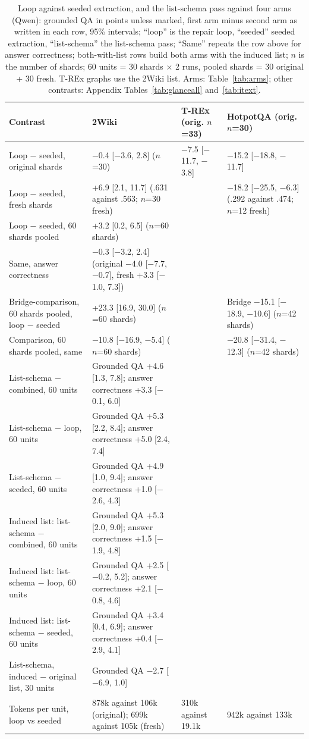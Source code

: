 \begin{table}[t]
\centering
\caption{Loop against seeded extraction, and the list-schema pass against four arms (Qwen): grounded QA in points unless marked, first arm minus second arm as written in each row, 95\% intervals; ``loop'' is the repair loop, ``seeded'' seeded extraction, ``list-schema'' the list-schema pass; ``Same'' repeats the row above for answer correctness; both-with-list rows build both arms with the induced list; $n$ is the number of shards; 60 units = 30 shards $\times$ 2 runs, pooled shards = 30 original + 30 fresh. T-REx graphs use the 2Wiki list. Arms: Table~\ref{tab:arms}; other contrasts: Appendix Tables~\ref{tab:glanceall} and~\ref{tab:itext}.}
\label{tab:glance}
\footnotesize\setlength{\tabcolsep}{2pt}
\begin{tabular}{P{5.6cm}P{5.0cm}P{3.0cm}P{3.3cm}}
\toprule
 Contrast & 2Wiki & T-REx (orig. $n$=33) & HotpotQA (orig. $n$=30) \\
\midrule
Loop $-$ seeded, original shards & $-$0.4 [$-$3.6, 2.8] ($n$=30) & $-$7.5 [$-$11.7, $-$3.8] & $-$15.2 [$-$18.8, $-$11.7] \\
Loop $-$ seeded, fresh shards & +6.9 [2.1, 11.7] (.631 against .563; $n$=30 fresh) & & $-$18.2 [$-$25.5, $-$6.3] (.292 against .474; $n$=12 fresh) \\
Loop $-$ seeded, 60 shards pooled & +3.2 [0.2, 6.5] ($n$=60 shards) & & \\
Same, answer correctness & $-$0.3 [$-$3.2, 2.4] (original $-$4.0 [$-$7.7, $-$0.7], fresh +3.3 [$-$1.0, 7.3]) & & \\
Bridge-comparison, 60 shards pooled, loop $-$ seeded & +23.3 [16.9, 30.0] ($n$=60 shards) & & Bridge $-$15.1 [$-$18.9, $-$10.6] ($n$=42 shards) \\
Comparison, 60 shards pooled, same & $-$10.8 [$-$16.9, $-$5.4] ($n$=60 shards) & & $-$20.8 [$-$31.4, $-$12.3] ($n$=42 shards) \\
List-schema $-$ combined, 60 units & Grounded QA +4.6 [1.3, 7.8]; answer correctness +3.3 [$-$0.1, 6.0] & & \\
List-schema $-$ loop, 60 units & Grounded QA +5.3 [2.2, 8.4]; answer correctness +5.0 [2.4, 7.4] & & \\
List-schema $-$ seeded, 60 units & Grounded QA +4.9 [1.0, 9.4]; answer correctness +1.0 [$-$2.6, 4.3] & & \\
Induced list: list-schema $-$ combined, 60 units & Grounded QA +5.3 [2.0, 9.0]; answer correctness +1.5 [$-$1.9, 4.8] & & \\
Induced list: list-schema $-$ loop, 60 units & Grounded QA +2.5 [$-$0.2, 5.2]; answer correctness +2.1 [$-$0.8, 4.6] & & \\
Induced list: list-schema $-$ seeded, 60 units & Grounded QA +3.4 [0.4, 6.9]; answer correctness +0.4 [$-$2.9, 4.1] & & \\
List-schema, induced $-$ original list, 30 units & Grounded QA $-$2.7 [$-$6.9, 1.0] & & \\
Tokens per unit, loop vs seeded & 878k against 106k (original); 699k against 105k (fresh) & 310k against 19.1k & 942k against 133k \\
\bottomrule
\end{tabular}
\end{table}
